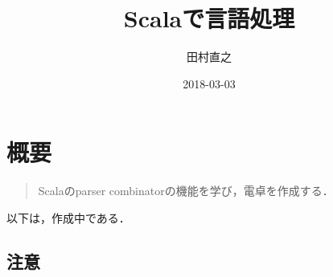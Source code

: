 \documentclass[a4j]{jsarticle}
\title{Scalaで言語処理}
\author{田村直之}
\date{2018-03-03}
\begin{document}
\maketitle

\setcounter{tocdepth}{3}
\tableofcontents
\vspace*{1cm}
\thispagestyle{plain}
\vskip -10mm

\section{概要}
\label{sec-1}

\begin{quote}
Scalaのparser combinatorの機能を学び，電卓を作成する．
\end{quote}

以下は，作成中である．
\subsection{注意}
\label{sec-1-1}
\end{document}
